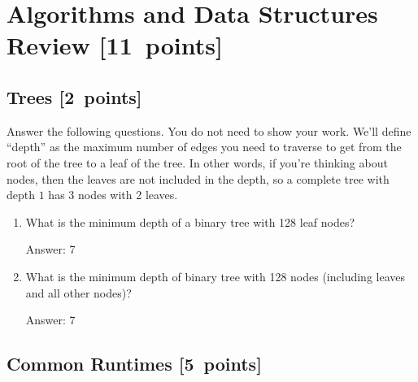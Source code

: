 \documentclass{article}
\newcommand{\blu}[1]{{\textcolor{blu}{#1}}}
\newenvironment{answer}{\par\begingroup\color{gre}Answer: }{\endgroup}
\let\ask\blu
\newcommand\pts[1]{\textcolor{pointscolour}{[#1~points]}}
\begin{document}
  \clearpage\section{Algorithms and Data Structures Review \pts{11}}

  \subsection{Trees \pts{2}}

  \ask{Answer the following questions.} You do not need to show your work. We'll define ``depth'' as the maximum number of edges you need to traverse to get from the root of the tree to a leaf of the tree. In other words, if you're thinking about nodes, then the leaves are not included in the depth, so a complete tree with depth $1$ has 3 nodes with 2 leaves.


  \begin{enumerate}
  \item What is the minimum depth of a binary tree with 128 leaf nodes?
  \begin{answer}
  7
  \end{answer}
  \item What is the minimum depth of binary tree with 128 nodes (including leaves and all other nodes)?
  \begin{answer}
  7
  \end{answer}
  \end{enumerate}

  \subsection{Common Runtimes \pts{5}}
\end{document}
